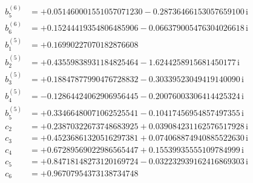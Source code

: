 {\begin{align*}
b^{(6)}_{5} &= +0.051460001551057071230 - 0.28736466153057659100\,\mathrm{i}\\
b^{(6)}_{6} &= +0.15244419354806485906 - 0.066379005476304026618\,\mathrm{i}\\[1mm]
b^{(5)}_{1} &= +0.16990227070182876608\\
b^{(5)}_{2} &= +0.43559838931184825464 - 1.6244258915681450177\,\mathrm{i}\\
b^{(5)}_{3} &= +0.18847877990476728832 - 0.30339523049419140090\,\mathrm{i}\\
b^{(5)}_{4} &= -0.12864424062906956445 - 0.20076003306414425324\,\mathrm{i}\\
b^{(5)}_{5} &= +0.33466480071062525541 - 0.10417456954857497355\,\mathrm{i}\\[1mm]
c_{2} &= +0.23870322673748683925 + 0.039084231162576517928\,\mathrm{i}\\
c_{3} &= +0.45236861320516297381 + 0.074068874940885522630\,\mathrm{i}\\
c_{4} &= +0.67289569022986565447 + 0.15539935555109784999\,\mathrm{i}\\
c_{5} &= +0.84718148273120169724 - 0.032232939162416869303\,\mathrm{i}\\
c_{6} &= +0.96707954373138734748
\end{align*}
}


